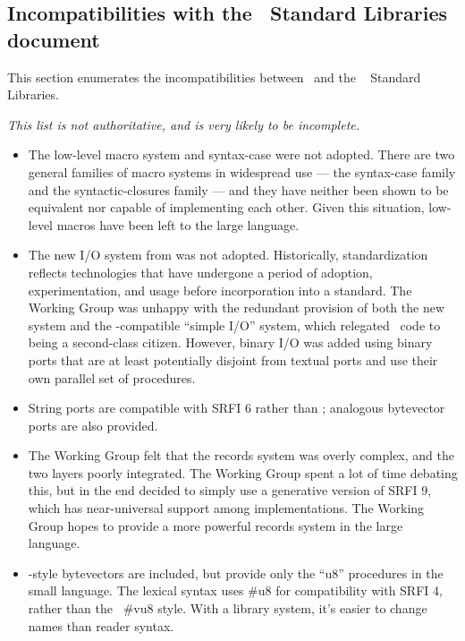 \subsection*{Incompatibilities with the \rsixrs\ Standard Libraries document}

This section enumerates the incompatibilities between \rsevenrs\ and
the \rsixrs~\cite{R6RS} Standard Libraries.

{\em This list is not authoritative, and is very likely to be incomplete.}

\begin{itemize}

\item The low-level macro system and {\cf syntax-case} were not adopted. There
are two general families of macro systems in widespread use --- the
{\cf syntax-case} family and the {\cf syntactic-closures} family --- and they have
neither been shown to be equivalent nor capable of implementing each
other. Given this situation,
low-level macros have been left to the large language.

\item The new I/O system from \rsixrs{} was not adopted. 
Historically, standardization reflects technologies that have undergone
a period of adoption, experimentation, and usage before incorporation
into a standard.  The Working Group was
unhappy with the redundant
provision of both the new system and the \rfivers{}-compatible ``simple I/O''
system, which
relegated \rfivers\ code to being a second-class
citizen.
However, binary I/O was added using binary ports that are
at least potentially disjoint from
textual ports and use their own parallel set of procedures.

\item String ports are compatible with SRFI 6 rather than \rsixrs; analogous
bytevector ports are also provided.

\item The Working Group felt that the \rsixrs{} records system was overly complex, and the two layers
poorly integrated. The Working Group spent a lot of time debating this, but in the
end decided to simply use a generative version of SRFI 9, which has
near-universal support among implementations. The Working Group hopes to provide a more
powerful records system in the large language.

\item \rsixrs{}-style bytevectors are included, but provide only the ``u8'' procedures in the small
language.  The lexical syntax uses {\cf \#u8} for compatibility
with SRFI 4, rather than the \rsixrs~{\cf \#vu8} style.
With a library system, it's easier to change names than reader syntax.


\end{itemize}
